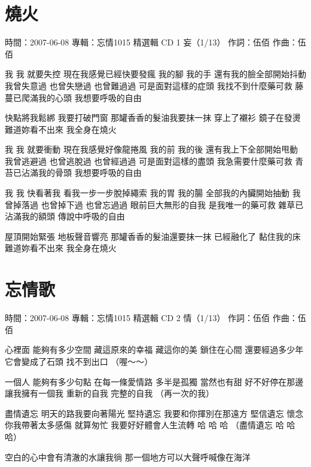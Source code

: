 \documentclass[UTF8,a4paper,oneside,twocolumn,12pt]{ctexbook}
\newcommand{\infopair}[2]{\textbullet #1：#2}
\newcommand{\zc}[1][伍佰]{\infopair{作詞}{#1}}
\newcommand{\zq}[1][伍佰]{\infopair{作曲}{#1}}
\newcommand{\zj}[1]{\infopair{專輯}{#1}}
\newcommand{\sj}[1]{\infopair{時間}{#1}}
\newenvironment{info}{\begin{flushleft}\kaishu
	}
	{\end{flushleft}\normalsize\yahei\par}
\newenvironment{lyric}{
	}
{}
\begin{document}
\section{燒火}
\begin{info}
	\sj{2007-06-08}
	\zj{忘情1015 精選輯 CD 1 妄（1/13）}
	\zc
	\zq
\end{info}
\begin{lyric}
	我 我 就要失控 現在我感覺已經快要發瘋
	我的腳 我的手 還有我的臉全部開始抖動
	我曾失意過 也曾失戀過 也曾難過過
	可是面對這樣的症頭 我找不到什麼藥可救
	藤蔓已爬滿我的心頭 我想要呼吸的自由

	快點將我鬆綁 我要打破門窗 那罐香香的髮油我要抹一抹
	穿上了襯衫 鏡子在發燙 難道妳看不出來 我全身在燒火

	我 我 就要衝動 現在我感覺好像龍捲風
	我的前 我的後 還有我上下全部開始甩動
	我曾逃避過 也曾逃脫過 也曾經過過
	可是面對這樣的盡頭 我急需要什麼藥可救
	青苔已沾滿我的骨頭 我想要呼吸的自由

	我 我 快看著我 看我一步一步脫掉繩索
	我的胃 我的腸 全部我的內臟開始抽動
	我曾掉落過 也曾掉下過 也曾忘過過
	眼前巨大無形的自我 是我唯一的藥可救
	雜草已沾滿我的額頭 傳說中呼吸的自由

	屋頂開始緊張 地板聲音響亮 那罐香香的髮油還要抹一抹
	已經融化了 黏住我的床 難道妳看不出來 我全身在燒火
\end{lyric}

\section{忘情歌}
\begin{info}
	\sj{2007-06-08}
	\zj{忘情1015 精選輯 CD 2 情（1/13）}
	\zc
	\zq
\end{info}
\begin{lyric}
	心裡面 能夠有多少空間
	藏這原來的幸福 藏這你的美
	鎖住在心間 還要經過多少年
	它會變成了石頭 找不到出口
	（喔～～）

	一個人 能夠有多少句點
	在每一條愛情路 多半是孤獨
	當然也有甜 好不好停在那邊
	讓我擁有一個我 重新的自我
	完整的自我 （再一次的我）

	盡情遺忘 明天的路我要向著陽光
	堅持遺忘 我要和你揮別在那遠方
	堅信遺忘 懷念你我帶著太多感傷
	就算匆忙 我要好好體會人生流轉
	哈 哈 哈 （盡情遺忘 哈 哈 哈）

	空白的心中會有清澈的水讓我徜
	那一個地方可以大聲呼喊像在海洋
\end{lyric}
\end{document}
